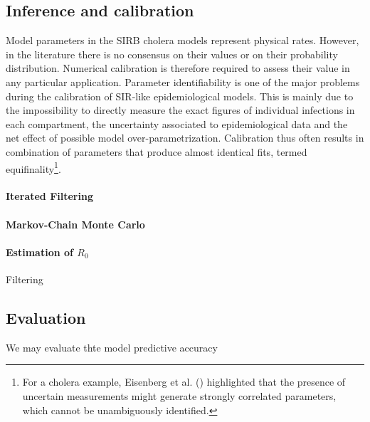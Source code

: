 \subsection{Inference and calibration} 
Model parameters in the SIRB cholera models represent physical rates. However, in the literature there is no consensus on their values or on their  probability distribution. Numerical calibration is therefore required to assess their value in any particular application. Parameter identifiability is one of the major problems during the calibration of SIR-like epidemiological models. This is mainly due to the impossibility to directly measure the exact figures of individual infections in each compartment, the uncertainty associated to epidemiological data and the net effect of possible model over-parametrization. Calibration thus often results in combination of parameters that produce almost identical fits, termed equifinality\footnote{For a cholera example, Eisenberg et al. () highlighted that the presence of uncertain measurements might generate strongly correlated parameters, which cannot be unambiguously identified.}.

\paragraph{Iterated Filtering}




\paragraph{Markov-Chain Monte Carlo}



\paragraph{Estimation of $R_0$} 

 Filtering
\subsection{Evaluation}
We may evaluate thte model predictive accuracy
